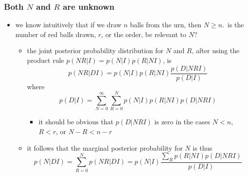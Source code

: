 \documentclass[../jaynes_prob_theory_notes.tex]{subfiles}
\begin{document}
    \subsubsection{Both $N$ and $R$ are unknown}
    \begin{itemize}
        \item we know intuitively that if we draw $n$ balls from the urn, then $N \geq n$.\ is the number of red balls drawn, $r$, or the order, be relevant to $N$?
            \begin{itemize}
                \item the joint posterior probability distribution for $N$ and $R$, after using the product rule $p(NR|I) = p(N|I)p(R|NI)$, is
                    \begin{equation*}
                        p(NR|DI) = p(N|I)p(R|NI) \frac{p(D|NRI)}{p(D|I)}
                    \end{equation*}
                where 
                    \begin{equation*}
                        p(D|I) = \sum^{\infty}_{N=0} \sum^{N}_{R=0} p(N|I)p(R|NI)p(D|NRI)
                    \end{equation*}
                    \begin{itemize}
                        \item it should be obvious that $p(D|NRI)$ is zero in the cases $N < n$, $R < r$, or $N-R < n-r$
                    \end{itemize}
                \item it follows that the marginal posterior probability for $N$ is thus
                    \begin{equation*}
                        p(N|DI) = \sum^{N}_{R=0}p(NR|DI) = p(N|I) \frac{\sum_{R}p(R|NI)p(D|NRI)}{p(D|I)}
                    \end{equation*}


\end{itemize}
\end{itemize}
\end{document}
